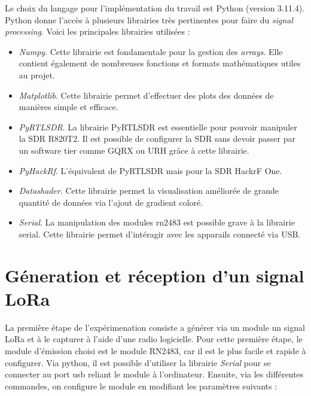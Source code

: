 Le choix du langage pour l'implémentation du travail est Python (version 3.11.4). Python donne l'accès à plusieurs librairies très pertinentes pour faire du \textit{signal processing}. Voici les principales librairies utilisées :

\vspace{0.1cm}

\begin{itemize}
\item \textit{Numpy}. Cette librairie est fondamentale pour la gestion des \textit{arrays}. Elle contient également de nombreuses fonctions et formats mathématiques utiles au projet.
\item \textit{Matplotlib}. Cette librairie permet d'effectuer des plots des données de manières simple et efficace.
\item \textit{PyRTLSDR}. La librairie PyRTLSDR est essentielle pour pouvoir manipuler la SDR R820T2. Il est possible de configurer la SDR sans devoir passer par un software tier comme GQRX ou URH grâce à cette librairie.
\item \textit{PyHackRf}. L'équivalent de PyRTLSDR mais pour la SDR HackrF One.
\item \textit{Datashader}. Cette librairie permet la visualisation améliorée de grande quantité de données via l'ajout de gradient coloré.
\item \textit{Serial}. La manipulation des modules rn2483 est possible grave à la librairie serial. Cette librairie permet d'intéragir avec les apparails connecté via USB.
\end{itemize}


\section{Géneration et réception d'un signal LoRa} \label{signallora}

La première étape de l'expérimenation consiste a générer via un module un signal LoRa et à le capturer à l'aide d'une radio logicielle. Pour cette première étape, le module d'émission choisi est le module RN2483, car il est le plus facile et rapide à configurer.
Via python, il est possible d'utiliser la librairie \textit{Serial} pour se connecter au port usb reliant le module à l'ordinateur. Ensuite, via les différentes commandes, on configure le module en modifiant les paramètres suivants : 

\vspace{0.1cm}


